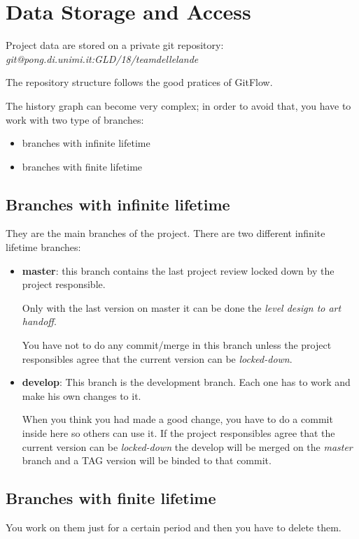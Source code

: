 \section{Data Storage and Access}
Project data are stored on a private git repository:\\
	\textit{git@pong.di.unimi.it:GLD/18/teamdellelande}

The repository structure follows the good pratices of GitFlow.

The history graph can become very complex; in order to avoid that, you have to work with two type of branches:
\begin{itemize}
	\item branches with infinite lifetime
	\item branches with finite lifetime
\end{itemize}

\subsection{Branches with infinite lifetime}
They are the main branches of the project. There are two different infinite lifetime branches:
\begin{itemize}
\item \textbf{master}: this branch contains the last project review locked down by the project responsible.

  Only with the last version on master it can be done the \textit{level design to art handoff}.

  You have not to do any commit/merge in this branch unless the project responsibles agree that the current version can be \textit{locked-down}.

\item \textbf{develop}: This branch is the development branch. Each one has to work and make his own changes to it.

  When you think you had made a good change, you have to do a commit inside here so others can use it.
  If the project responsibles agree that the current version can be \textit{locked-down} the develop will be merged on the \textit{master} branch and a TAG version will be binded to that commit.
\end{itemize}

\subsection{Branches with finite lifetime}
You work on them just for a certain period and then you have to delete them.

